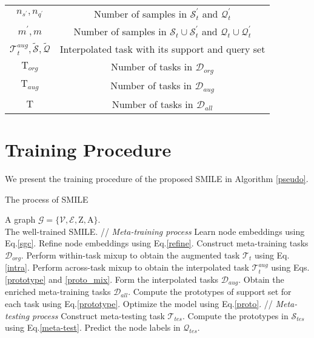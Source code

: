 \begin{table}[!ht]
{\begin{tabular}{@{}c|c@{}}
    $n_{s^\prime}, n_{q^\prime}$ & Number of samples in $\mathcal{S}_t^\prime$ and $\mathcal{Q}_t^\prime$ \\
    $m^\prime, m$ & Number of samples in $\mathcal{S}_t\cup\mathcal{S}_t^\prime$ and $\mathcal{Q}_t\cup\mathcal{Q}_t^\prime$ \\
    $\mathcal{T}_t^{aug}, \tilde{\mathcal{S}}, \tilde{\mathcal{Q}}$ & Interpolated task with its support and query set \\
    $\mathrm{T}_{org}$ & Number of tasks in $\mathcal{D}_{org}$ \\
    $\mathrm{T}_{aug}$ & Number of tasks in $\mathcal{D}_{aug}$ \\
    $\mathrm{T}$ & Number of tasks in $\mathcal{D}_{all}$ \\
    \bottomrule
\end{tabular} %
}
\end{table}


\section{Training Procedure}
We present the training procedure of the proposed SMILE in Algorithm \ref{pseudo}.

\label{training_procedure}
\begin{algorithm}[ht]
\renewcommand{\algorithmicrequire}{\textbf{Input:}}
\renewcommand{\algorithmicensure}{\textbf{Output:}}
\caption{The process of SMILE}
\label{pseudo}
\begin{algorithmic}[1]
\REQUIRE A graph $\mathcal{G}\!=\!\{\mathcal{V},\mathcal{E},\mathrm{Z},\mathrm{A}\}$.\\
\ENSURE The well-trained SMILE.
\STATE // \textit{Meta-training process}
    \STATE Learn node embeddings using Eq.\ref{sgc}.
    \STATE Refine node embeddings using Eq.\ref{refine}.
    \STATE Construct meta-training tasks $\mathcal{D}_{org}$. %
    \STATE Perform within-task mixup to obtain the augmented task $\mathcal{T}_t$ using Eq.\ref{intra}.
    \STATE Perform across-task mixup to obtain the interpolated task $\mathcal{T}_t^{aug}$ using Eqs.\ref{prototype} and \ref{proto_mix}.
    \STATE Form the interpolated tasks $\mathcal{D}_{aug}$.
    \STATE Obtain the enriched meta-training tasks $\mathcal{D}_{all}$.
    \STATE Compute the prototypes of support set for each task using Eq.\ref{prototype}.
    \STATE Optimize the model using Eq.\ref{proto}.
    \ENDWHILE
    \STATE // \textit{Meta-testing process}
    \STATE Construct meta-testing task $\mathcal{T}_{tes}$.
    \STATE Compute the prototypes in $\mathcal{S}_{tes}$ %
    using Eq.\ref{meta-test}.  %
    \STATE Predict the node labels in $\mathcal{Q}_{tes}$. %
\end{algorithmic}
\end{algorithm}


